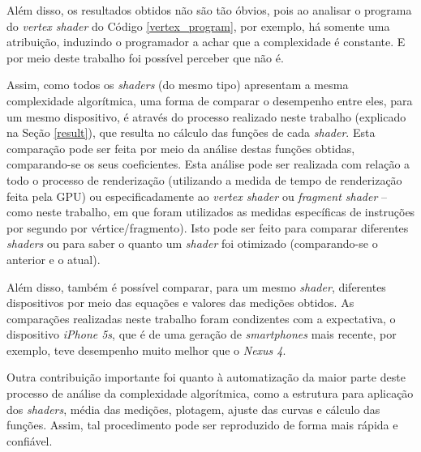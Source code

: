 	 

	Além disso, os resultados obtidos não são tão óbvios, pois ao analisar o programa do \textit{vertex shader} do Código \ref{vertex_program}, por exemplo, há somente uma atribuição, induzindo o programador  a achar que a complexidade é constante. E por meio deste trabalho foi possível perceber que não é.

	 
	
	Assim, como todos os \textit{shaders} (do mesmo tipo) apresentam a mesma complexidade algorítmica, uma forma de comparar o desempenho entre eles, para um mesmo dispositivo, é através do processo realizado neste trabalho (explicado na Seção \ref{result}), que resulta no cálculo das funções de cada \textit{shader}. Esta comparação pode ser feita por meio da análise destas funções obtidas, comparando-se os seus coeficientes. Esta análise pode ser realizada com relação a todo o processo de renderização (utilizando a medida de tempo de renderização feita pela GPU) ou especificadamente ao \textit{vertex shader} ou \textit{fragment shader} -- como neste trabalho, em que foram utilizados as medidas específicas de instruções por segundo por vértice/fragmento).  Isto pode ser feito para comparar diferentes \textit{shaders} ou para saber o quanto um \textit{shader} foi otimizado (comparando-se o anterior e o atual). 

	Além disso, também é possível comparar, para um mesmo \textit{shader}, diferentes dispositivos por meio das equações e valores das medições obtidos. As comparações realizadas neste trabalho foram condizentes com a expectativa, o dispositivo \textit{iPhone 5s},  que é de uma geração de \textit{smartphones} mais recente, por exemplo, teve desempenho muito melhor que o \textit{Nexus 4}.   	

	Outra contribuição importante foi quanto à automatização da maior parte deste processo de análise da complexidade algorítmica, como a estrutura para aplicação dos \textit{shaders}, média das medições, plotagem, ajuste das curvas e cálculo das funções. Assim, tal procedimento pode ser reproduzido de forma mais rápida e confiável. 
